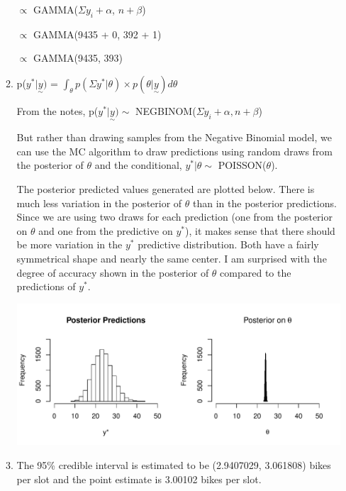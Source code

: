 \documentclass{article}\usepackage[]{graphicx}\usepackage[]{color}
\makeatletter
\def\maxwidth{ %
  \ifdim\Gin@nat@width>\linewidth
    \linewidth
  \else
    \Gin@nat@width
  \fi
}
\newenvironment{knitrout}{}{} %
\makeatother
\begin{document}
\begin{enumerate}
\begin{enumerate}
$\propto$ GAMMA($\Sigma y_{i} + \alpha$, $n+\beta$)

$\propto$ GAMMA(9435 + 0, 392 + 1)

$\propto$ GAMMA(9435, 393)



\item%
p($y^{*} | \underset{\sim}{y})$ = $\int_{\theta} p(\Sigma y^{*} | \theta) \times p(\theta | \underset{\sim}{y}) d\theta$

From the notes, p($y^{*} | \underset{\sim}{y}) \sim$ NEGBINOM($\Sigma y_{i} + \alpha, n + \beta$)

But rather than drawing samples from the Negative Binomial model, we can use the MC algorithm to draw predictions using random draws from the posterior of $\theta$ and the conditional, $y^{*} | \theta \sim$ POISSON($\theta$).

The posterior predicted values generated are plotted below. There is much less variation in the posterior of $\theta$ than in the posterior predictions. Since we are using two draws for each prediction (one from the posterior on $\theta$ and one from the predictive on $y^{*}$), it makes sense that there should be more variation in the $y^{*}$ predictive distribution. Both have a fairly symmetrical shape and nearly the same center. I am surprised with the degree of accuracy shown in the posterior of $\theta$ compared to the predictions of $y^{*}$.
\begin{knitrout}
\color{fgcolor}

{\centering \includegraphics[width=\maxwidth]{figure/prob2d-1} 

}



\end{knitrout}

\item %


The 95\% credible interval is estimated to be (2.9407029, 3.061808) bikes per slot and the point estimate is 3.00102 bikes per slot.


\end{enumerate}
\end{enumerate}
\end{document}
